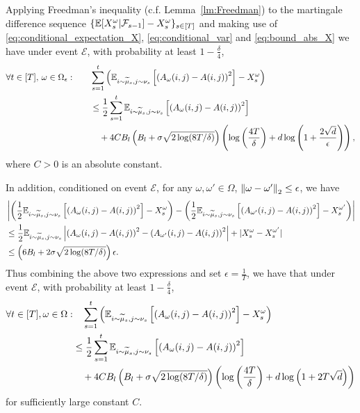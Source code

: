 Applying Freedman's inequality (c.f. Lemma~\ref{lm:Freedman}) to the martingale difference sequence $\{\mathbb{E}[X_s^\omega|{\mathcal{F}}_{s-1}]-X_s^\omega\}_{s\in[T]}$ and making use of \eqref{eq:conditional_expectation_X}, \eqref{eq:conditional_var} and \eqref{eq:bound_abs_X} we have under event $\mathcal{E}$, with probability at least $1-\frac{\delta}{4}$,
\begin{align*}%
    \forall t\in[T],\,\omega\in\Omega_\epsilon: \qquad &  \sum_{s=1}^t\left(\E_{i\sim\widetilde{\mu}_s,j\sim\nu_s}\left[\left(A_\omega(i,j)-A(i,j)\right)^2\right] - X_s^\omega\right)\notag\\
    &\leq\frac{1}{2} \sum_{s=1}^t\E_{i\sim\widetilde{\mu}_s,j\sim\nu_s}\left[\left(A_\omega(i,j)-A(i,j)\right)^2\right]\notag\\
    &\quad+ 4C B_l\left(B_l+\sigma\sqrt{2\log(8T/\delta)}\right) \left(\log\left(\frac{4T}{\delta}\right)+d\log\left(1+\frac{2\sqrt{d}}{\epsilon}\right)\right),
\end{align*}
where $C>0$ is an absolute constant.

In addition, conditioned on event $\mathcal{E}$, 
for any $\omega,\omega'\in\Omega$, $\left\| \omega-\omega' \right\|_2\leq \epsilon$, we have
\begin{align*}
& \left|\left(\frac{1}{2}\mathbb{E}_{i\sim\widetilde{\mu}_s,j\sim\nu_s}\left[\left(A_\omega(i,j)-A(i,j)\right)^2\right] - X_s^\omega\right)-\left(\frac{1}{2}\mathbb{E}_{i\sim\widetilde{\mu}_s,j\sim\nu_s}\left[\left(A_{\omega'}(i,j)-A(i,j)\right)^2\right] - X_s^{\omega'}\right)\right|\notag\\
&\leq \frac{1}{2}\mathbb{E}_{i\sim\widetilde{\mu}_s,j\sim\nu_s}\left|\left(A_\omega(i,j)-A(i,j)\right)^2-\left(A_{\omega'}(i,j)-A(i,j)\right)^2\right|+|X_s^\omega-X_s^{\omega'}|\notag\\
&\leq \left(6B_l+2\sigma\sqrt{2\log(8T/\delta)}\right)\epsilon.
\end{align*}
Thus combining the above two expressions and set $\epsilon=\frac{1}{T}$, we have that under event $\mathcal{E}$, with probability at least $1-\frac{\delta}{4}$,
\begin{align}%
    \forall t\in[T],\omega\in\Omega:&\quad \sum_{s=1}^t\left(\E_{i\sim\widetilde{\mu}_s,j\sim\nu_s}\left[\left(A_\omega(i,j)-A(i,j)\right)^2\right] - X_s^\omega\right)\notag\\
    &\leq\frac{1}{2} \sum_{s=1}^t\E_{i\sim\widetilde{\mu}_s,j\sim\nu_s}\left[\left(A_\omega(i,j)-A(i,j)\right)^2\right]\notag\\
    &\quad+ 4C B_l\left(B_l+\sigma\sqrt{2\log(8T/\delta)}\right)  \left(\log\left(\frac{4T}{\delta}\right)+d\log\left(1+2T\sqrt{d}\right)\right)  
    \end{align}
for sufficiently large constant $C$.
 

